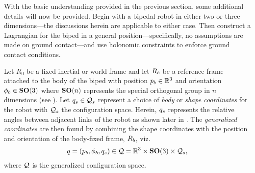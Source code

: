 %
%

With the basic understanding provided in the previous section, some additional
details will now be provided.
%
Begin with a bipedal robot in either two or three dimensions---the discussions
herein are applicable to either case.
%
Then construct a Lagrangian for the biped in a general position---specifically,
no assumptions are made on ground contact---and use holonomic constraints to
enforce ground contact conditions.

Let $R_{0}$ be a fixed inertial or world frame and let $R_{b}$ be a reference
frame attached to the body of the biped with position $p_{b} \in \mathbb{R}^{3}$ and
orientation $\phi_{b} \in \mathbf{SO}(3)$ where $\mathbf{SO}(n)$ represents the special
orthogonal group in $n$ dimensions (see \cite{Conway1985}).
%
Let $q_{s} \in \mathcal{Q}_{s}$ represent a choice of {\em body} or {\em shape
  coordinates} for the robot with $\mathcal{Q}_{s}$ the configuration space.
%
Herein, $q_{s}$ represents the relative angles between adjacent links of the
robot as shown later in .
%
The {\em generalized coordinates} are then found by combining the shape
coordinates with the position and orientation of the body-fixed frame, $R_{b}$,
viz.
%
\begin{align*}
  q = (p_{b}, \phi_{b}, q_{s}) \in \mathcal{Q} = \mathbb{R}^{3} \times \mathbf{SO}(3)
  \times \mathcal{Q}_{s},
\end{align*}
%
where $\mathcal{Q}$ is the generalized configuration space.

